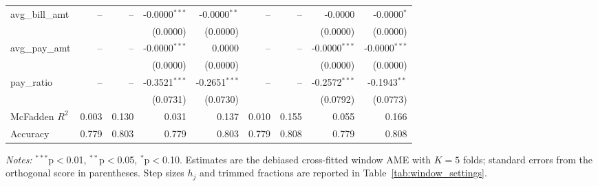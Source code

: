 \begin{table}[htbp]
\begin{threeparttable}
\begin{tabular}{lrrrrrrrr}
\quad avg\_bill\_amt & -- & -- & -0.0000$^{***}$ & -0.0000$^{**}$ & -- & -- & -0.0000 & -0.0000$^{*}$ \\
 &  &  & (0.0000) & (0.0000) &  &  & (0.0000) & (0.0000) \\
\quad avg\_pay\_amt & -- & -- & -0.0000$^{***}$ & 0.0000 & -- & -- & -0.0000$^{***}$ & -0.0000$^{***}$ \\
 &  &  & (0.0000) & (0.0000) &  &  & (0.0000) & (0.0000) \\
\quad pay\_ratio & -- & -- & -0.3521$^{***}$ & -0.2651$^{***}$ & -- & -- & -0.2572$^{***}$ & -0.1943$^{**}$ \\
 &  &  & (0.0731) & (0.0730) &  &  & (0.0792) & (0.0773) \\
\midrule
McFadden $R^2$ & 0.003 & 0.130 & 0.031 & 0.137 & 0.010 & 0.155 & 0.055 & 0.166 \\
Accuracy & 0.779 & 0.803 & 0.779 & 0.803 & 0.779 & 0.808 & 0.779 & 0.808 \\
\bottomrule
\end{tabular}
\begin{tablenotes}
\footnotesize
\item \textit{Notes:} $^{***}$p$<$0.01, $^{**}$p$<$0.05, $^{*}$p$<$0.10. Estimates are the debiased cross-fitted window AME with $K=5$ folds; standard errors from the orthogonal score in parentheses. Step sizes $h_j$ and trimmed fractions are reported in Table~\ref{tab:window_settings}.
\end{tablenotes}
\end{threeparttable}
\end{table}